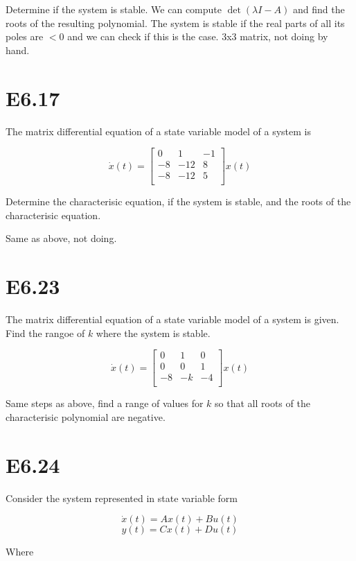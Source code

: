 \documentclass[11pt]{article}
\begin{document}
Determine if the system is stable. We can compute $\det(\lambda I - A)$ and find the roots of the resulting polynomial. The system is stable if the real parts of all its poles are $< 0$ and we can check if this is the case. 3x3 matrix, not doing by hand.

\section{E6.17}

The matrix differential equation of a state variable model of a system is

\[
    \dot x(t) =
    \begin{bmatrix}
        0 & 1 & -1 \\
        -8 & -12 & 8 \\
        -8 & -12 & 5 \\
    \end{bmatrix}
    x(t)
\]

Determine the characterisic equation, if the system is stable, and the roots of the characterisic equation.

Same as above, not doing.

\section{E6.23}

The matrix differential equation of a state variable model of a system is given. Find the rangoe of $k$ where the system is stable.

\[
    \dot x(t) =
    \begin{bmatrix}
        0 & 1 & 0 \\
        0 & 0 & 1 \\
        -8 & -k & -4 \\
    \end{bmatrix}
    x(t)
\]

Same steps as above, find a range of values for $k$ so that all roots of the characterisic polynomial are negative.

\section{E6.24}

Consider the system represented in state variable form

\[ \dot x(t) = Ax(t) + Bu(t) \]
\[ y(t) = Cx(t) + Du(t) \]

Where
\end{document}
